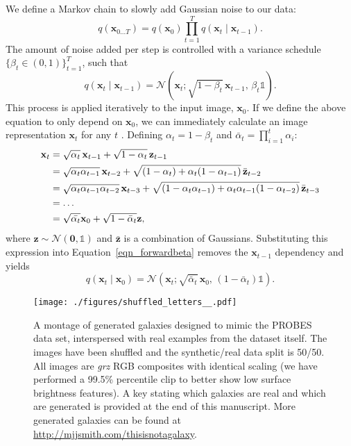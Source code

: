 \documentclass[fleqn,usenatbib]{mnras}
\begin{document}
We define a Markov chain to slowly add Gaussian noise to our data: 
\begin{equation}
    q(\mathbf{x}_{0 \ldots T}) = q(\mathbf{x}_0)\prod^T_{t=1} q(\mathbf{x}_t \mid \mathbf{x}_{t-1}).
\end{equation}
The amount of noise added per step is controlled with a variance schedule
$\{\beta_t \in (0, 1)\}^T_{t=1}$, such that
\begin{equation}
    q(\mathbf{x}_t \mid \mathbf{x}_{t-1}) = \mathcal{N}(\mathbf{x}_t; \sqrt{1 - \beta_t}\,\mathbf{x}_{t-1},\,\beta_t\mathds{1}).
    \label{eqn_forwardbeta}
\end{equation}
This process is applied iteratively to the input image, $\mathbf{x}_0$. 
If we define the above equation to only depend on $\mathbf{x}_0$, we
can immediately calculate an image representation $\mathbf{x}_t$ for any $t$
\citep{cite_ho2020}. Defining $\alpha_t = 1 - \beta_t$ and
$\bar{\alpha}_t = \prod^t_{i=1} \alpha_i$:
\begin{align}
    \mathbf{x}_t &= \sqrt{\alpha_t}\,\mathbf{x}_{t-1} + \sqrt{1 - \alpha_t}\,\mathbf{z}_{t-1}\notag\\
                 &= \sqrt{\alpha_t \alpha_{t-1}}\,\mathbf{x}_{t-2} + \sqrt{(1 - \alpha_t) + \alpha_{t} (1 - \alpha_{t-1})}\,\bar{\mathbf{z}}_{t-2}\notag\\
                 &= \sqrt{\alpha_t \alpha_{t-1} \alpha_{t-2}}\,\mathbf{x}_{t-3} + \sqrt{(1 - \alpha_t \alpha_{t-1}) + \alpha_{t} \alpha_{t-1} (1 - \alpha_{t-2})}\,\bar{\mathbf{z}}_{t-3}\notag\\
                 &= \ldots\notag\\
                 &= \sqrt{\bar{\alpha_t}} \mathbf{x}_{0} + \sqrt{1 - \bar{\alpha}_{t}}\mathbf{z},
\end{align}
where $\mathbf{z} \sim \mathcal{N}(\mathbf{0}, \mathds{1})$ and
$\bar{\mathbf{z}}$ is a combination of Gaussians. Substituting this
expression into Equation~\ref{eqn_forwardbeta} removes the $\mathbf{x}_{t-1}$
dependency and yields
\begin{equation}
    q(\mathbf{x}_t \mid \mathbf{x}_0) = \mathcal{N}(\mathbf{x}_t; \sqrt{\bar{\alpha}_t}\,\mathbf{x}_0,\,(1-\bar{\alpha}_t)\mathds{1}).
\end{equation}


\begin{figure*}
    \texttt{[image: ./figures/shuffled\_letters\_\_.pdf]}
    \caption{A montage of generated galaxies designed to mimic the PROBES data
    set, interspersed with real examples from the dataset itself. The images
    have been shuffled and the synthetic/real data split is 50/50. All images
    are {\it grz} RGB composites with identical scaling (we have performed a
    99.5\% percentile clip to better show low surface brightness features). A key
    stating which galaxies are real and which are generated is provided at the
    end of this manuscript. More generated galaxies can be found at
    \url{http://mjjsmith.com/thisisnotagalaxy}.}
    \label{FIG_GALAXIES}
\end{figure*}
\end{document}
